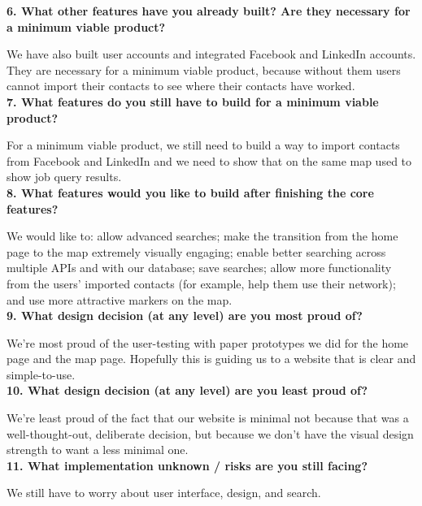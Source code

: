 \documentclass[12pt]{article}
\begin{document}
\noindent
\textbf{6. What other features have you already built? Are they necessary for a minimum viable product?}

We have also built user accounts and integrated Facebook and LinkedIn accounts.  They are necessary for a minimum viable product, because without them users cannot import their contacts to see where their contacts have worked. \\

\noindent
\textbf{7. What features do you still have to build for a minimum viable product?}
 
For a minimum viable product, we still need to build a way to import contacts from Facebook and LinkedIn and we need to show that on the same map used to show job query results. \\

\noindent
\textbf{8. What features would you like to build after finishing the core features?}

We would like to: allow advanced searches; make the transition from the home page to the map extremely visually engaging; enable better searching across multiple APIs and with our database; save searches; allow more functionality from the users' imported contacts (for example, help them use their network); and use more attractive markers on the map.\\

\noindent
\textbf{9. What design decision (at any level) are you most proud of?} 

We're most proud of the user-testing with paper prototypes we did for the home page and the map page.  Hopefully this is guiding us to a website that is clear and simple-to-use.  \\

\noindent
\textbf{10. What design decision (at any level) are you least proud of?} 

We're least proud of the fact that our website is minimal not because that was a well-thought-out, deliberate decision, but because we don't have the visual design strength to want a less minimal one.\\

\noindent
\textbf{11. What implementation unknown / risks are you still facing?}

We still have to worry about user interface, design, and search.
\end{document}
